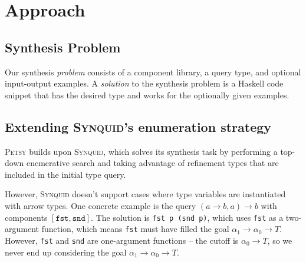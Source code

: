 \documentclass[acmsmall,nonacm]{acmart}
\begin{document}
\section{Approach}
\label{approach}



\subsection{Synthesis Problem}

Our synthesis \textit{problem} consists of a component library, a query type,
and optional input-output examples. A \textit{solution} to the synthesis 
problem is a Haskell code snippet that has the desired type and works 
for the optionally given examples.


\subsection{Extending \textsc{Synquid}'s enumeration strategy} 

\textsc{Petsy} builds upon \textsc{Synquid}, which solves its synthesis task 
by performing a top-down enemerative search and taking advantage of
refinement types that are included in the initial type query. 





However, \textsc{Synquid} doesn't support cases where type variables are
instantiated with  arrow types. One concrete example is the query $(a \to b,
a) \to b$  with components $[\texttt{fst}, \texttt{snd}]$. The solution is 
\texttt{fst p (snd p)}, which uses \texttt{fst} as a two-argument function, 
which means \texttt{fst} must have filled the goal $\alpha_1 \to \alpha_0 \to
T$. However, \texttt{fst} and \texttt{snd} are one-argument functions --  the
cutoff is $\alpha_0 \to T$, so we never end up considering the goal $\alpha_1
\to \alpha_0 \to T$.
\end{document}
